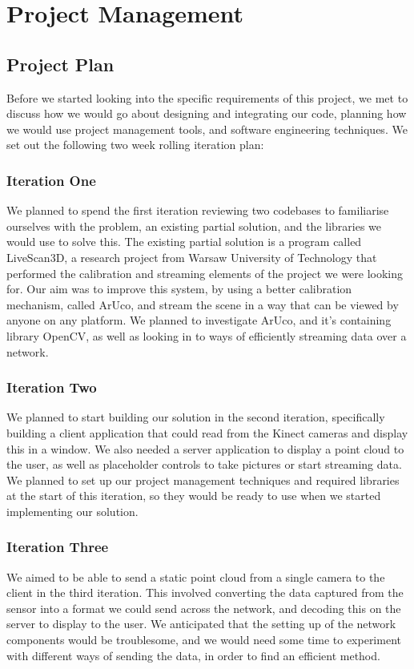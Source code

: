 \documentclass{article}
\begin{document}
\newpage
\section{Project Management}
\subsection{Project Plan}
Before we started looking into the specific requirements of this project, we met to discuss how we would go about designing and integrating our code, planning how we would use project management tools, and software engineering techniques. We set out the following two week rolling iteration plan:

\subsubsection{Iteration One}
We planned to spend the first iteration reviewing two codebases to familiarise ourselves with the problem, an existing partial solution, and the libraries we would use to solve this. The existing partial solution is a program called LiveScan3D, a research project from Warsaw University of Technology that performed the calibration and streaming elements of the project we were looking for. Our aim was to improve this system, by using a better calibration mechanism, called ArUco, and stream the scene in a way that can be viewed by anyone on any platform. We planned to investigate ArUco, and it's containing library OpenCV, as well as looking in to ways of efficiently streaming data over a network.
\subsubsection{Iteration Two}
We planned to start building our solution in the second iteration, specifically building a client application that could read from the Kinect cameras and display this in a window. We also needed a server application to display a point cloud to the user, as well as placeholder controls to take pictures or start streaming data. We planned to set up our project management techniques and required libraries at the start of this iteration, so they would be ready to use when we started implementing our solution.
\subsubsection{Iteration Three}
We aimed to be able to send a static point cloud from a single camera to the client in the third iteration. This involved converting the data captured from the sensor into a format we could send across the network, and decoding this on the server to display to the user. We anticipated that the setting up of the network components would be troublesome, and we would need some time to experiment with different ways of sending the data, in order to find an efficient method.
\end{document}

